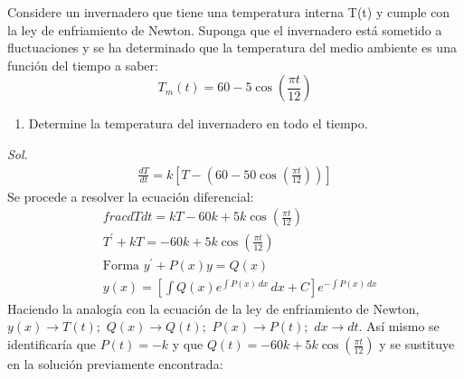 \begin{problem}
    Considere un invernadero que tiene una temperatura interna T(t) y cumple con la ley de enfriamiento de Newton. Suponga que el invernadero está sometido a fluctuaciones y se ha determinado que la temperatura del medio ambiente es una función del tiempo a saber:
    \begin{equation*}
        T_m(t)=60-5\cos{\left(\frac{\pi t}{12}\right)}
    \end{equation*}
    \begin{enumerate}
        \item Determine la temperatura del invernadero en todo el tiempo.
    \end{enumerate}
\end{problem}

\textit{ Sol. }
\begin{align*}
    \frac{dT}{dt}=k\left[T-\left(60-50\cos{\left(\frac{\pi t}{12}\right)}\right)\right]
\end{align*}
Se procede a resolver la ecuación diferencial:
\begin{align*}
    &frac{dT}{dt}=kT-60k+5k\cos{\left(\frac{\pi t}{12}\right)}\\
    &T^{\prime}+kT=-60k+5k\cos{\left(\frac{\pi t}{12}\right)}\\
    &\text{Forma }y^{\prime}+P(x)y=Q(x)\\
    &y(x)=\left[\int Q(x)e^{\int P(x)\, dx}\,dx+C\right]e^{-\int P(x)\, dx}
\end{align*}
Haciendo la analogía con la ecuación de la ley de enfriamiento de Newton, $y(x)\to T(t);$ $Q(x)\to Q(t);$ $P(x)\to P(t);$ $dx\to dt$. Así mismo se identificaría que 
$P(t)=-k$ y que $Q(t)=-60k+5k\cos{\left(\frac{\pi t}{12}\right)}$ y se sustituye en la solución previamente encontrada:
